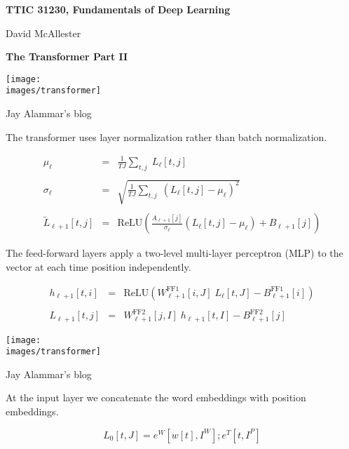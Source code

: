 




{\Huge
  \centerline{\bf TTIC 31230,  Fundamentals of Deep Learning}
  \vfill
  \centerline{David McAllester}
  \vfill
  \centerline{\bf  The Transformer Part II}
  \vfill
  \vfill


\centerline{\texttt{[image: \\images/transformer]}}

{\Large
\centerline{Jay Alammar's blog}
}


The transformer uses layer normalization rather than batch normalization.

\vfill
\begin{eqnarray*}
  \mu_\ell & = & \frac{1}{TJ} \sum_{t,j} \;L_\ell[t,j] \\
  \\
  \sigma_{\ell} & = & \sqrt{\frac{1}{TJ} \sum_{t,j}\;(L_\ell[t,j] - \mu_\ell)^2} \\
  \\
  \tilde{L}_{\ell+1}[t,j] & = & \mathrm{ReLU}\left(\frac{A_{\ell+1}[j]}{\sigma_\ell}(L_\ell[t,j] -\mu_\ell) + B_{\ell+1}[j]\right)
\end{eqnarray*}


The feed-forward layers apply a two-level multi-layer perceptron (MLP) to the vector at each time position independently.

\vfill

\begin{eqnarray*}
h_{\ell+1}[t,i] & = & \mathrm{ReLU}(W^{\mathrm{FF1}}_{\ell+1}[i,J]\;L_\ell[t,J] - B^{\mathrm{FF1}}_{\ell+1}[i]) \\
\\
L_{\ell+1}[t,j] & = & W^{\mathrm{FF2}}_{\ell+1}[j,I]\;h_{\ell+1}[t,I] - B^\mathrm{FF2}_{\ell+1}[j]
\end{eqnarray*}


\centerline{\texttt{[image: \\images/transformer]}}

{\huge
\centerline{Jay Alammar's blog}
}


At the input layer we concatenate the word embeddings with position embeddings.

\vfill
{\color{red} $$L_0[t,J] = e^W[w[t],I^W];e^T[t,I^P]$$}

}
